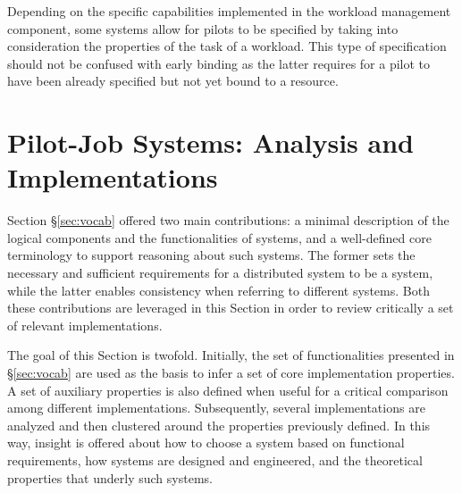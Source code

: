 \documentclass{sig-alternate}
\begin{document}
Depending on the specific capabilities implemented in the workload management
component, some \pilotjob systems allow for pilots to be specified by taking
into consideration the properties of the task of a workload. This type of
specification should not be confused with early binding as the latter requires
for a pilot to have been already specified but not yet bound to a resource.


\section{Pilot-Job Systems: Analysis and Implementations}\label{sec:4}

Section \S\ref{sec:vocab} offered two main contributions: a minimal description
of the logical components and the functionalities of \pilotjob systems, and a
well-defined core terminology to support reasoning about such systems. The
former sets the necessary and sufficient requirements for a distributed system
to be a \pilotjob system, while the latter enables consistency when referring
to different \pilotjob systems. Both these contributions are leveraged in this
Section in order to review critically a set of relevant \pilotjob
implementations.


The goal of this Section is twofold.  Initially, the set of
functionalities presented in \S\ref{sec:vocab} are used as the basis
to infer a set of core implementation properties. A set of auxiliary
properties is also defined when useful for a critical comparison among
different \pilotjob implementations. Subsequently, several \pilotjob
implementations are analyzed and then clustered around the properties
previously defined. In this way, insight is offered about how to
choose a \pilotjob system based on functional requirements, how
\pilotjob systems are designed and engineered, and the theoretical
properties that underly such systems.
\end{document}

